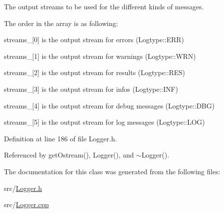 The output streams to be used for the different kinds of messages. 

The order in the array is as following\-: 
\begin{DoxyItemize}
\item streams\-\_\-\mbox{[}0\mbox{]} is the output stream for errors (Logtype\-::\-E\-R\-R) 
\item streams\-\_\-\mbox{[}1\mbox{]} is the output stream for warnings (Logtype\-::\-W\-R\-N) 
\item streams\-\_\-\mbox{[}2\mbox{]} is the output stream for results (Logtype\-::\-R\-E\-S) 
\item streams\-\_\-\mbox{[}3\mbox{]} is the output stream for infos (Logtype\-::\-I\-N\-F) 
\item streams\-\_\-\mbox{[}4\mbox{]} is the output stream for debug messages (Logtype\-::\-D\-B\-G) 
\item streams\-\_\-\mbox{[}5\mbox{]} is the output stream for log messages (Logtype\-::\-L\-O\-G) 
\end{DoxyItemize}

Definition at line 186 of file Logger.\-h.



Referenced by get\-Ostream(), Logger(), and $\sim$\-Logger().



The documentation for this class was generated from the following files\-:\begin{DoxyCompactItemize}
\item 
src/\hyperlink{Logger_8h}{Logger.\-h}\item 
src/\hyperlink{Logger_8cpp}{Logger.\-cpp}\end{DoxyCompactItemize}
